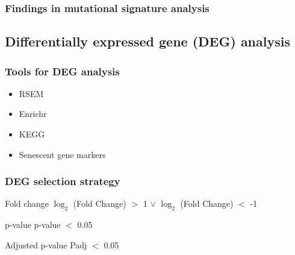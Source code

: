 \documentclass{beamer}
\begin{document}
            \begin{frame}
                \frametitle{Findings in mutational signature analysis}
            \end{frame}

        \subsection{Differentially expressed gene (DEG) analysis}
            \begin{frame}
                \frametitle{Tools for DEG analysis}

                \begin{itemize}
                    \item RSEM \cite{rsem-01}
                    \item Enrichr \cite{enrichr-01}
                    \item KEGG \cite{kegg-01}
                    \item Senescent gene markers \cite{senescent-04}
                \end{itemize}
            \end{frame}

            \begin{frame}
                \frametitle{DEG selection strategy}

                \begin{block}{Fold change}
                    $\log_2$ (Fold Change) $>$ 1 $\vee$ $\log_2$ (Fold Change) $<$ -1
                \end{block}

                \begin{block}{p-value}
                    p-value $<$ 0.05
                \end{block}

                \begin{block}{Adjusted p-value}
                    Padj $<$ 0.05
                \end{block}
            \end{frame}
\end{document}
